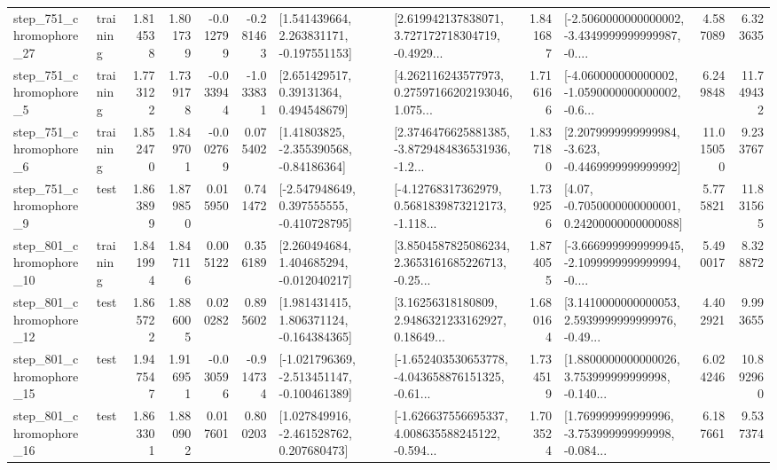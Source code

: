 \begin{tabular}{llrrrrllrlrr}
  step\_751\_chromophore\_27 &  training &      1.814538 &    1.801739 &     -0.012799 & -0.281463 &    [1.541439664, 2.263831171, -0.197551153] &  [2.619942137838071, 3.727172718304719, -0.4929... &       1.841687 &  [-2.5060000000000002, -3.4349999999999987, -0.... &            4.587089 &          6.323635 \\
   step\_751\_chromophore\_5 &  training &      1.773122 &    1.739178 &     -0.033944 & -1.033831 &      [2.651429517, 0.39131364, 0.494548679] &  [4.262116243577973, 0.27597166202193046, 1.075... &       1.716166 &  [-4.060000000000002, -1.0590000000000002, -0.6... &            6.249848 &         11.749432 \\
   step\_751\_chromophore\_6 &  training &      1.852470 &    1.849701 &     -0.002769 &  0.075402 &     [1.41803825, -2.355390568, -0.84186364] &  [2.3746476625881385, -3.8729484836531936, -1.2... &       1.837180 &  [2.2079999999999984, -3.623, -0.4469999999999992] &           11.015050 &          9.233767 \\
   step\_751\_chromophore\_9 &      test &      1.863899 &    1.879850 &      0.015950 &  0.741472 &   [-2.547948649, 0.397555555, -0.410728795] &  [-4.12768317362979, 0.5681839873212173, -1.118... &       1.739256 &   [4.07, -0.7050000000000001, 0.24200000000000088] &            5.775821 &         11.831565 \\
  step\_801\_chromophore\_10 &  training &      1.841994 &    1.847116 &      0.005122 &  0.356189 &    [2.260494684, 1.404685294, -0.012040217] &  [3.8504587825086234, 2.3653161685226713, -0.25... &       1.874055 &  [-3.6669999999999945, -2.1099999999999994, -0.... &            5.490017 &          8.328872 \\
  step\_801\_chromophore\_12 &      test &      1.865722 &    1.886005 &      0.020282 &  0.895602 &    [1.981431415, 1.806371124, -0.164384365] &  [3.16256318180809, 2.9486321233162927, 0.18649... &       1.680164 &  [3.1410000000000053, 2.5939999999999976, -0.49... &            4.402921 &          9.993655 \\
  step\_801\_chromophore\_15 &      test &      1.947547 &    1.916951 &     -0.030596 & -0.914734 &  [-1.021796369, -2.513451147, -0.100461389] &  [-1.652403530653778, -4.043658876151325, -0.61... &       1.734519 &  [1.8800000000000026, 3.753999999999998, -0.140... &            6.024246 &         10.892960 \\
  step\_801\_chromophore\_16 &      test &      1.863301 &    1.880902 &      0.017601 &  0.800203 &    [1.027849916, -2.461528762, 0.207680473] &  [-1.626637556695337, 4.008635588245122, -0.594... &       1.703524 &  [1.769999999999996, -3.753999999999998, -0.084... &            6.187661 &          9.537374 \\

\end{tabular}
